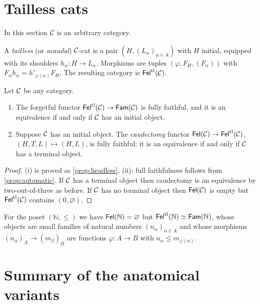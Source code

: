 \section{Tailless cats}\label{sec:tailless}

In this section $\mathcal{C}$ is an arbitrary category.

\begin{definition}\label{def:tailless}
A \emph{tailless} (or \emph{acaudal}) $\mathcal{C}$-cat is a pair
$(H,(L_\alpha)_{\alpha\in A})$ with $H$ initial, equipped with its shoulders
$h_\alpha\colon H\to L_\alpha$. Morphisms are tuples $(\varphi,F_H,(F_\alpha))$
with $F_\alpha h_\alpha=h'_{\varphi(\alpha)}F_H$. The resulting category is
$\mathsf{Fel}^{\mathrm{tl}}(\mathcal{C})$.
\end{definition}

\begin{proposition}\label{prop:tailless}
Let $\mathcal{C}$ be any category.
\begin{enumerate}
\item The forgetful functor $\mathsf{Fel}^{\mathrm{tl}}(\mathcal{C})\to\mathsf{Fam}(\mathcal{C})$ is fully faithful,
  and it is an equivalence if and only if $\mathcal{C}$ has an initial object.
\item Suppose $\mathcal{C}$ has an initial object. The \emph{caudectomy} functor
  $\mathsf{Fel}(\mathcal{C})\to\mathsf{Fel}^{\mathrm{tl}}(\mathcal{C})$, $(H,T,L)\mapsto(H,L)$, is fully faithful; it is
  an equivalence if and only if $\mathcal{C}$ has a terminal object.
\end{enumerate}
\end{proposition}

\begin{proof}
(i) is proved as \cref{prop:headless}. (ii): full faithfulness follows from
\cref{prop:automatic}. If $\mathcal{C}$ has a terminal object then caudectomy is an
equivalence by two-out-of-three as before. If $\mathcal{C}$ has no terminal object
then $\mathsf{Fel}(\mathcal{C})$ is empty but $\mathsf{Fel}^{\mathrm{tl}}(\mathcal{C})$ contains $(0,\varnothing)$.
\end{proof}

\begin{example}\label{ex:tailless-N}
For the poset $(\mathbb N,\le)$ we have $\mathsf{Fel}(\mathbb N)=\varnothing$ but
$\mathsf{Fel}^{\mathrm{tl}}(\mathbb N)\simeq\mathsf{Fam}(\mathbb N)$, whose objects are small families of
natural numbers $(n_\alpha)_{\alpha\in A}$ and whose morphisms
$(n_\alpha)_A\to(m_\beta)_B$ are functions $\varphi\colon A\to B$ with
$n_\alpha\le m_{\varphi(\alpha)}$.
\end{example}

\section{Summary of the anatomical variants}\label{sec:anatomy-table}

